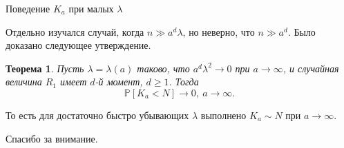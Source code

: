 \documentclass[aspectratio=1610]{beamer}
\theoremstyle{plain}
\newtheorem{thm}{Теорема} %
\theoremstyle{definition}
\theoremstyle{remark}
\def\geq{\geqslant}
\newcommand{\PP}{\mathbb{P}}
\begin{document}
\begin{frame}{Поведение $K_a$ при малых $\lambda$}

Отдельно изучался случай, когда $n\gg a^d\lambda$, но неверно, что $n\gg a^d$. Было доказано следующее утверждение.

\begin{thm}
    Пусть $\lambda = \lambda(a)$ таково, что $a^d\lambda^2 \to 0$ при $a\to\infty$, и случайная величина $R_1$ имеет $d$-й момент, $d\geq 1$. Тогда $$\PP[K_a < N] \to 0, \  a\to\infty.$$
\end{thm}

То есть для достаточно быстро убывающих $\lambda$ выполнено $K_a \sim N$ при $a\to\infty$.
    
\end{frame}


\begin{frame}
\begin{center}
\Huge Спасибо за внимание.
\end{center}
\end{frame}
\end{document}
